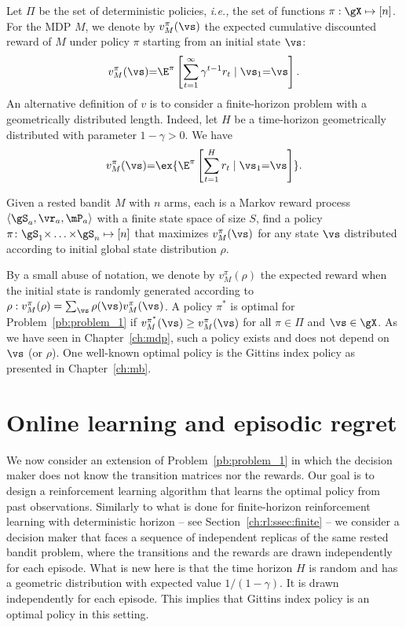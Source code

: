 Let $\Pi$ be the set of deterministic policies, \emph{i.e.,} the set of
functions $\pi:\gX\mapsto[n]$. For the MDP $M$, we denote by
$v_{M}^{\pi}(\vs)$ the expected cumulative discounted reward of ${M}$ under policy $\pi$ starting from an initial state $\vs$:
\[v_{M}^\pi(\vs) {=}
\E^\pi\left[\sum_{t=1}^{\infty} \gamma^{t-1}r_t \mid \vs_1{=}\vs\right].\]
An alternative definition of $v$ is to consider a finite-horizon problem with a geometrically distributed length. Indeed, let $H$ be a time-horizon geometrically distributed with parameter $1-\gamma>0$. We have
\begin{equation}
    \label{eq:V-vs_R}
    v_{M}^\pi(\vs)  {=} \ex{\E^\pi\left[\sum_{t=1}^{H} r_t \mid \vs_1{=}\vs\right]}.
\end{equation}
\begin{prob}
\label{pb:problem_1}
Given a rested bandit $M$ with $n$ arms, each is a Markov reward process $\langle\gS_a,\vr_a,\mP_a\rangle$ with a finite state space of size $S$, find a policy $\pi\colon\gS_1{\times}\dots{\times}\gS_n\mapsto[n]$ that maximizes $v_{M}^\pi(\vs)$ for any state $\vs$ distributed according to initial global state distribution $\rho$.
\end{prob}

By a small abuse of notation, we denote by $v_M^\pi(\rho)$ the expected reward when the initial state is randomly generated according to $\rho: v_M^\pi(\rho)=\sum_{\vs}\rho(\vs)v_{M}^\pi(\vs)$.
A policy
$\pi^*$ is optimal for Problem~\ref{pb:problem_1} if $ v_{M}^{\pi^*}(\vs) \ge v_{M}^\pi(\vs) $ for all
$\pi\in\Pi$ and $\vs\in\gX$.
As we have seen in Chapter~\ref{ch:mdp},
such a policy exists and does not depend on $\vs$ (or $\rho$). One well-known optimal policy is the Gittins index policy as presented in Chapter~\ref{ch:mb}. 


\section{Online learning and episodic regret}
\label{ch:rested:sec:problem}

We now consider an extension of Problem~\ref{pb:problem_1} in which the decision maker does not know the transition matrices
nor the rewards. Our goal is to design a reinforcement learning algorithm that
learns the optimal policy from past observations.  Similarly to what is done
for finite-horizon reinforcement learning with deterministic horizon -- see
Section~\ref{ch:rl:ssec:finite} --
we consider a decision maker that faces a sequence of independent replicas of
the same rested bandit problem, where the transitions and the rewards 
are drawn independently for each episode.
What is new here is that the time horizon $H$ is random and has a geometric distribution with expected value $1/(1-\gamma)$. It is drawn  independently for each episode. This implies that Gittins index policy is an optimal policy in this setting. %

